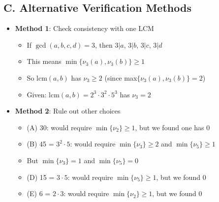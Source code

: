 \documentclass[12pt]{article}
\begin{document}
\begin{verificationbox}
\subsection*{C. Alternative Verification Methods}
\begin{itemize}[leftmargin=*]
    \item \textbf{Method 1}: Check consistency with one LCM
    \begin{itemize}
        \item If $\gcd(a,b,c,d) = 3$, then $3 | a$, $3 | b$, $3 | c$, $3 | d$
        \item This means $\min\{\nu_3(a), \nu_3(b)\} \geq 1$
        \item So $\text{lcm}(a,b)$ has $\nu_3 \geq 2$ (since max$\{\nu_3(a), \nu_3(b)\} = 2$)
        \item Given: $\text{lcm}(a,b) = 2^3 \cdot 3^2 \cdot 5^3$ has $\nu_3 = 2$ \checkmark
    \end{itemize}
    \item \textbf{Method 2}: Rule out other choices
    \begin{itemize}
        \item (A) 30: would require $\min\{\nu_2\} \geq 1$, but we found one has 0
        \item (B) 45 = $3^2 \cdot 5$: would require $\min\{\nu_3\} \geq 2$ and $\min\{\nu_5\} \geq 1$
        \item But $\min\{\nu_3\} = 1$ and $\min\{\nu_5\} = 0$
        \item (D) 15 = $3 \cdot 5$: would require $\min\{\nu_5\} \geq 1$, but we found 0
        \item (E) 6 = $2 \cdot 3$: would require $\min\{\nu_2\} \geq 1$, but we found 0
    \end{itemize}
\end{itemize}
\end{verificationbox}
\end{document}
